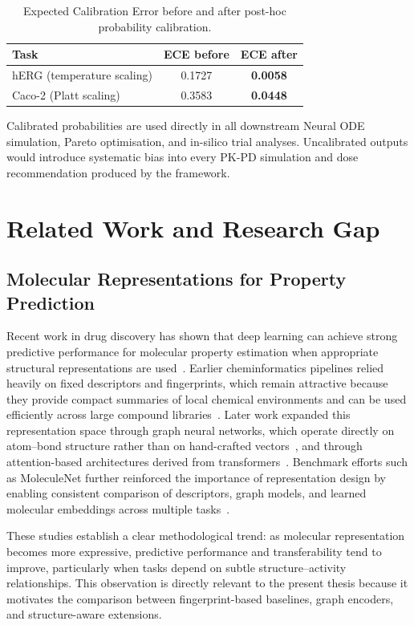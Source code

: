 \documentclass[a4paper,11pt,twoside]{report}
\begin{document}
\begin{table}[htbp]
\centering
\caption{Expected Calibration Error before and after post-hoc probability calibration.}
\begin{tabular}{lcc}
\hline
\textbf{Task} & \textbf{ECE before} & \textbf{ECE after} \\
\hline
hERG (temperature scaling) & 0.1727 & \textbf{0.0058} \\
Caco-2 (Platt scaling)      & 0.3583 & \textbf{0.0448} \\
\hline
\end{tabular}
\end{table}

Calibrated probabilities are used directly in all downstream Neural ODE simulation, Pareto optimisation, and in-silico trial analyses. Uncalibrated outputs would introduce systematic bias into every PK-PD simulation and dose recommendation produced by the framework.

\chapter{Related Work and Research Gap}

\section{Molecular Representations for Property Prediction}

Recent work in drug discovery has shown that deep learning can achieve strong predictive performance for molecular property estimation when appropriate structural representations are used~\cite{chen2021}. Earlier cheminformatics pipelines relied heavily on fixed descriptors and fingerprints, which remain attractive because they provide compact summaries of local chemical environments and can be used efficiently across large compound libraries~\cite{wale2008}. Later work expanded this representation space through graph neural networks, which operate directly on atom--bond structure rather than on hand-crafted vectors~\cite{kearnes2016, gilmer2017mpnn}, and through attention-based architectures derived from transformers~\cite{vaswani2017attention}. Benchmark efforts such as MoleculeNet further reinforced the importance of representation design by enabling consistent comparison of descriptors, graph models, and learned molecular embeddings across multiple tasks~\cite{wu2018}.

These studies establish a clear methodological trend: as molecular representation becomes more expressive, predictive performance and transferability tend to improve, particularly when tasks depend on subtle structure--activity relationships. This observation is directly relevant to the present thesis because it motivates the comparison between fingerprint-based baselines, graph encoders, and structure-aware extensions.
\end{document}
